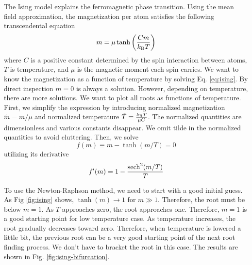 The Ising model explains the ferromagnetic phase transition.\cite{Ising}  Using the mean field approximation, the magnetization  per atom satisfies the following transcendental equation
\begin{equation}\label{eq:ising}
m = \mu \tanh \left ( \frac{C m}{k_\text{B} T} \right ) 
\end{equation}
where $C$ is a positive constant determined by the spin interaction between atoms, $T$ is temperature, and $\mu$ is the magnetic moment each spin carries.  We want to know the magnetization as a function of temperature by solving Eq. \eqref{eq:ising}.
By direct inspection $m=0$ is always a solution.  However, depending on temperature, there are more solutions. We want to plot all roots as functions of temperature.  First, we simplify the expression by introducing normalized magnetization $\tilde{m}=m/\mu$ and normalized temperature $\tilde{T}=\frac{k_\text{B} T}{\mu C}$. The normalized quantities are dimensionless and various constants disappear.  We omit tilde in the normalized quantities to avoid cluttering. Then, we solve
\begin{equation}
f(m) \equiv m - \tanh(m/T) = 0
\label{eq:ising2}
\end{equation}
utilizing its derivative
\begin{equation}
f'(m) = 1 - \frac{\sech^2 (m/T)}{T}
\end{equation}

To use the Newton-Raphson method, we need to start with a good initial guess.  As Fig \ref{fig:ising} shows, $\tanh(m) \rightarrow 1$ for $m \gg 1$.  Therefore, the root must be below $m=1$.  As $T$ approaches zero, the root approaches one.  Therefore, $m=1$ is a good starting point for low temperature case.  As temperature increases, the root gradually decreases toward zero.  Therefore, when temperature is lowered a little bit, the previous root can be a very good starting point of the next root finding process. We don't have to bracket the root in this case. 
The results are shown in Fig. \ref{fig:ising-bifurcation}.

